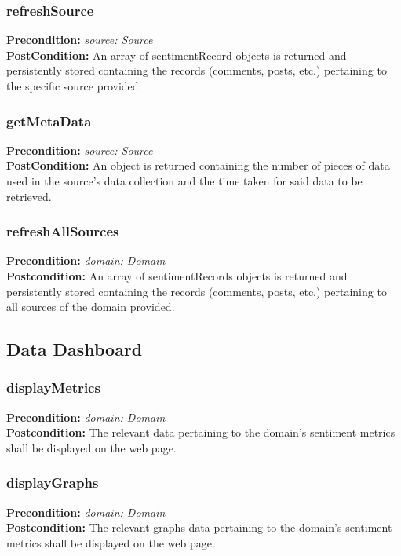 \documentclass[12pt]{article}
\begin{document}
\subsubsection*{refreshSource}
\textbf{Precondition:} \textit{source: Source} \\
\textbf{PostCondition:} An array of sentimentRecord objects is returned and persistently stored containing the records (comments, posts, etc.) pertaining to the specific source provided.

\subsubsection*{getMetaData}
\textbf{Precondition:} \textit{source: Source} \\
\textbf{PostCondition:} An object is returned containing the number of pieces of data used in the source's data collection and the time taken for said data to be retrieved.

\subsubsection*{refreshAllSources}
\textbf{Precondition:} \textit{domain: Domain} \\
\textbf{Postcondition:} An array of sentimentRecords objects is returned and persistently stored containing the records (comments, posts, etc.) pertaining to all sources of the domain provided.

\subsection{Data Dashboard}

\subsubsection*{displayMetrics}
\textbf{Precondition:} \textit{domain: Domain} \\
\textbf{Postcondition:} The relevant data pertaining to the domain's sentiment metrics shall be displayed on the web page.

\subsubsection*{displayGraphs}
\textbf{Precondition:} \textit{domain: Domain} \\
\textbf{Postcondition:} The relevant graphs data pertaining to the domain's sentiment metrics shall be displayed on the web page.
\end{document}
